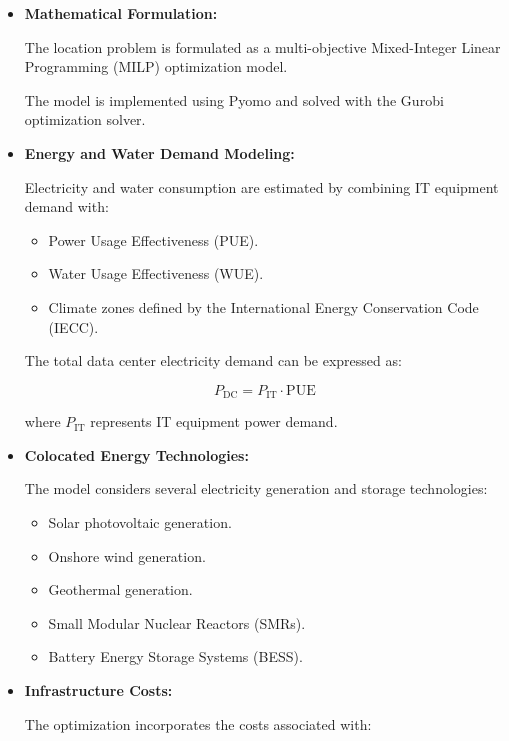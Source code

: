 \begin{itemize}

    \item \textbf{Mathematical Formulation:}

    The location problem is formulated as a multi-objective Mixed-Integer Linear Programming (MILP) optimization model.

    The model is implemented using Pyomo and solved with the Gurobi optimization solver.

    \item \textbf{Energy and Water Demand Modeling:}

    Electricity and water consumption are estimated by combining IT equipment demand with:

    \begin{itemize}
        \item Power Usage Effectiveness (PUE).
        \item Water Usage Effectiveness (WUE).
        \item Climate zones defined by the International Energy Conservation Code (IECC).
    \end{itemize}

    The total data center electricity demand can be expressed as:

    \[
        P_{\mathrm{DC}} =
        P_{\mathrm{IT}} \cdot \mathrm{PUE}
    \]

    where $P_{\mathrm{IT}}$ represents IT equipment power demand.

    \item \textbf{Colocated Energy Technologies:}

    The model considers several electricity generation and storage technologies:

    \begin{itemize}
        \item Solar photovoltaic generation.
        \item Onshore wind generation.
        \item Geothermal generation.
        \item Small Modular Nuclear Reactors (SMRs).
        \item Battery Energy Storage Systems (BESS).
    \end{itemize}

    \item \textbf{Infrastructure Costs:}

    The optimization incorporates the costs associated with:


\end{itemize}
